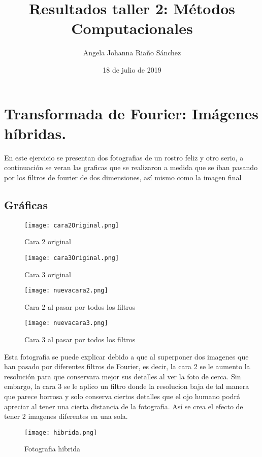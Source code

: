 \documentclass[a4paper]{article}
\title{Resultados taller 2: Métodos Computacionales}
\author{Angela Johanna Riaño Sánchez}
\date{18 de julio de 2019}
\begin{document}
\maketitle

\section{Transformada de Fourier: Imágenes híbridas.}
En este ejercicio se presentan dos fotografias de un rostro feliz y otro serio, a continuación se veran las graficas que se realizaron a medida que se iban pasando por los filtros de fourier de dos dimensiones, así mismo como la imagen final 

\subsection{Gráficas}

\begin{figure}[H]
\texttt{[image: cara2Original.png]}
\caption{Cara 2 original}
\centering
\end{figure}

\begin{figure}[H]
\texttt{[image: cara3Original.png]}
\caption{Cara 3 original}
\centering
\end{figure}

\begin{figure}[H]
\texttt{[image: nuevacara2.png]}
\caption{Cara 2 al pasar por todos los filtros}
\centering
\end{figure}

\begin{figure}[H]
\texttt{[image: nuevacara3.png]}
\caption{Cara 3 al pasar por todos los filtros}
\centering
\end{figure}

Esta fotografia se puede explicar debido a que al superponer dos imagenes que han pasado por diferentes filtros de Fourier, es decir, la cara 2 se le aumento la resolución para que conservara mejor sus detalles al ver la foto de cerca. Sin embargo, la cara 3 se le aplico un filtro donde la resolucion baja de tal manera que parece borrosa y solo conserva ciertos detalles que el ojo humano podrá apreciar al tener una cierta distancia de la fotografia. Así se crea el efecto de tener 2 imagenes diferentes en una sola.

\begin{figure}[H]
\texttt{[image: hibrida.png]}
\caption{Fotografia hibrida}
\centering
\end{figure}
\end{document}
